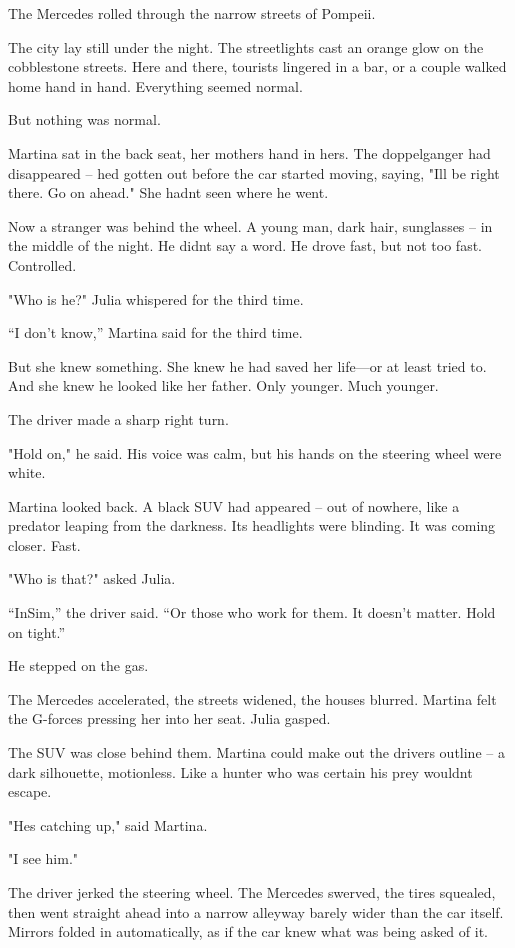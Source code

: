 \documentclass[
]{article}
\begin{document}
The Mercedes rolled through the narrow streets of Pompeii.

The city lay still under the night. The streetlights cast an orange glow on the cobblestone streets. Here and there, tourists lingered in a bar, or a couple walked home hand in hand. Everything seemed normal.

But nothing was normal.

Martina sat in the back seat, her mother\textquotesingle s hand in hers. The doppelganger had disappeared -- he\textquotesingle d gotten out before the car started moving, saying, "I\textquotesingle ll be right there. Go on ahead." She hadn\textquotesingle t seen where he went.

Now a stranger was behind the wheel. A young man, dark hair, sunglasses -- in the middle of the night. He didn\textquotesingle t say a word. He drove fast, but not too fast. Controlled.

"Who is he?" Julia whispered for the third time.

``I don't know,'' Martina said for the third time.

But she knew something. She knew he had saved her life---or at least tried to. And she knew he looked like her father. Only younger. Much younger.

The driver made a sharp right turn.

"Hold on," he said. His voice was calm, but his hands on the steering wheel were white.

Martina looked back. A black SUV had appeared -- out of nowhere, like a predator leaping from the darkness. Its headlights were blinding. It was coming closer. Fast.

"Who is that?" asked Julia.

``InSim,'' the driver said. ``Or those who work for them. It doesn't matter. Hold on tight.''

He stepped on the gas.

The Mercedes accelerated, the streets widened, the houses blurred. Martina felt the G-forces pressing her into her seat. Julia gasped.

The SUV was close behind them. Martina could make out the driver\textquotesingle s outline -- a dark silhouette, motionless. Like a hunter who was certain his prey wouldn\textquotesingle t escape.

"He\textquotesingle s catching up," said Martina.

"I see him."

The driver jerked the steering wheel. The Mercedes swerved, the tires squealed, then went straight ahead into a narrow alleyway barely wider than the car itself. Mirrors folded in automatically, as if the car knew what was being asked of it.
\end{document}
